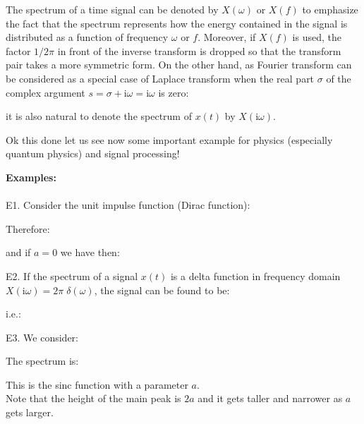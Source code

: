		
	The spectrum of a time signal can be denoted by $X(\omega)$ or $X(f)$ to emphasize the fact that the spectrum represents how the energy contained in the signal is distributed as a function of frequency $\omega$ or $f$. Moreover, if $X(f)$ is used, the factor $1/2\pi$ in front of the inverse transform is dropped so that the transform pair takes a more symmetric form. On the other hand, as Fourier transform can be considered as a special case  of Laplace transform when the real part $\sigma$ of the complex argument $s=\sigma+\mathrm{i}\omega=\mathrm{i}\omega$ is zero:
	
	it is also natural to denote the spectrum of $x(t)$ by $X(\mathrm{i}\omega)$.
	
	Ok this done let us see now some important example for physics (especially quantum physics) and signal processing!
	\begin{tcolorbox}[colframe=black,colback=white,sharp corners]
	\textbf{{\Large {}}Examples:}\\\\
	E1. Consider the unit impulse function (Dirac function):
	
	Therefore:
	
	and if $a=0$ we have then:
	
	E2. If the spectrum of a signal $x(t)$ is a delta function in frequency domain $X(\mathrm{i}\omega)=2\pi\;\delta(\omega)$, the signal can be found to be:
	
	i.e.:
	
	E3. We consider:
	
	The spectrum is:
	
	This is the sinc function with a parameter $a$.\\
	
	Note that the height of the main peak is $2a$ and it gets taller and narrower as	$a$ gets larger.
	
	\end{tcolorbox}
	
